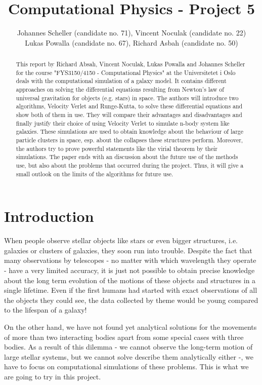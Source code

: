 \documentclass[10pt,a4paper]{article}
\author{Johannes Scheller (candidate no. 71), Vincent Noculak (candidate no. 22)\\ Lukas Powalla (candidate no. 67), Richard Asbah (candidate no. 50) }
\title{Computational Physics - Project 5}
\begin{document}
\maketitle
\newpage
\tableofcontents
\newpage

\begin{abstract}
This report by Richard Absah, Vincent Noculak, Lukas Powalla and Johannes Scheller for the course "FYS3150/4150 - Computational Physics" at the Universitetet i Oslo deals with the computational simulation of a galaxy model. It contains different approaches on solving the differential equations resulting from Newton's law of universal gravitation for objects (e.g. stars) in space. The authors will introduce two algorithms, Velocity Verlet and Runge-Kutta, to solve these differential equations and show both of them in use. They will compare their advantages and disadvantages and finally justify their choice of using Velocity Verlet to simulate n-body system like galaxies. These simulations are used to obtain knowledge about the behaviour of large particle clusters in space, esp. about the collapses these structures perform. Moreover, the authors try to prove powerful statements like the virial theorem by their simulations. The paper ends with an discussion about the future use of the methods use, but also about the problems that occurred during the project. Thus, it will give a small outlook on the limits of the algorithms for future use.
\end{abstract}
\section{Introduction}
When people observe stellar objects like stars or even bigger structures, i.e. galaxies or clusters of galaxies, they soon run into trouble. Despite the fact that many observations by telescopes - no matter with which wavelength they operate - have a very limited accuracy, it is just not possible to obtain precise knowledge about the long term evolution of the motions of these objects and structures in a single lifetime. Even if the first humans had started with exact observations of all the objects they could see, the data collected by theme would be young compared to the lifespan of a galaxy!

On the other hand, we have not found yet analytical solutions for the movements of more than two interacting bodies apart from some special cases with three bodies. As a result of this dilemma - we cannot observe the long-term motion of large stellar systems, but we cannot solve describe them analytically either -, we have to focus on computational simulations of these problems. This is what we are going to try in this project.
\end{document}

